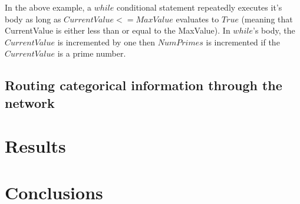 \documentclass{article}
\begin{document}
	In the above example, a $while$ conditional statement repeatedly executes it's body as long as $CurrentValue <= MaxValue$ evaluates to $True$ (meaning that CurrentValue is either less than or equal to the MaxValue). In $while$'s body, the $CurrentValue$ is incremented by one then $NumPrimes$ is incremented if the $CurrentValue$ is a prime number. 

\subsection{Routing categorical information through the network}

\section{Results}

\section{Conclusions}


\end{document}
